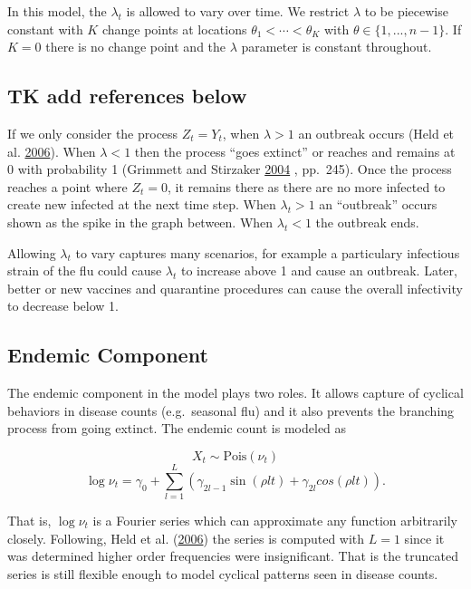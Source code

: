 \documentclass[11pt,a4paper]{article}
\numberwithin{equation}{section}
\begin{document}
In this model, the \(\lambda_t\) is allowed to vary over time. We
restrict \(\lambda\) to be piecewise constant with \(K\) change points
at locations \(\theta_1 < \cdots < \theta_K\) with
\(\theta \in \{1,...,n-1\}\). If \(K = 0\) there is no change point and
the \(\lambda\) parameter is constant throughout.

\hypertarget{tk-add-references-below}{%
\subsection{TK add references below}\label{tk-add-references-below}}

If we only consider the process \(Z_t = Y_t\), when \(\lambda > 1\) an
outbreak occurs (Held et al.
\protect\hyperlink{ref-held_two-component_2006}{2006}). When
\(\lambda < 1\) then the process ``goes extinct'' or reaches and remains
at 0 with probability 1 (Grimmett and Stirzaker
\protect\hyperlink{ref-grimmett_probability_2004}{2004} , pp.~245). Once
the process reaches a point where \(Z_t = 0\), it remains there as there
are no more infected to create new infected at the next time step. When
\(\lambda_t > 1\) an ``outbreak'' occurs shown as the spike in the graph
between. When \(\lambda_t < 1\) the outbreak ends.

Allowing \(\lambda_t\) to vary captures many scenarios, for example a
particulary infectious strain of the flu could cause \(\lambda_t\) to
increase above 1 and cause an outbreak. Later, better or new vaccines
and quarantine procedures can cause the overall infectivity to decrease
below 1.

\hypertarget{endemic-component}{%
\subsection{Endemic Component}\label{endemic-component}}

The endemic component in the model plays two roles. It allows capture of
cyclical behaviors in disease counts (e.g.~seasonal flu) and it also
prevents the branching process from going extinct. The endemic count is
modeled as

\[X_t \sim \text{Pois}(\nu_t)\]
\[\log{\nu_t} = \gamma_0 + \sum_{l = 1}^L (\gamma_{2l-1}\sin(\rho l t)+\gamma_{2l}cos(\rho l t)).\]

That is, \(\log{\nu_t}\) is  a Fourier series which can
approximate any function arbitrarily closely. Following, Held et al.
(\protect\hyperlink{ref-held_two-component_2006}{2006}) the series is
computed with \(L = 1\) since it was determined higher order frequencies
were insignificant. That is the truncated series is still flexible
enough to model cyclical patterns seen in disease counts.
\end{document}
